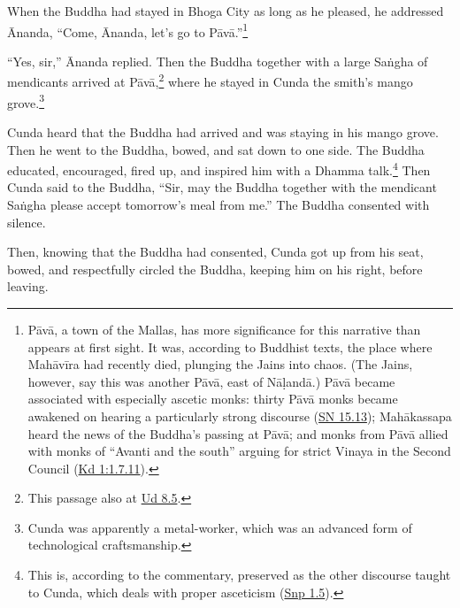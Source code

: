 \documentclass[12pt,openany]{book}%
\begin{document}
When the Buddha had stayed in Bhoga City as long as he pleased, he addressed Ānanda, “Come, Ānanda, let’s go to \textsanskrit{Pāvā}.”\footnote{\textsanskrit{Pāvā}, a town of the Mallas, has more significance for this narrative than appears at first sight. It was, according to Buddhist texts, the place where \textsanskrit{Mahāvīra} had recently died, plunging the Jains into chaos. (The Jains, however, say this was another \textsanskrit{Pāvā}, east of \textsanskrit{Nāḷandā}.) \textsanskrit{Pāvā} became associated with especially ascetic monks: thirty \textsanskrit{Pāvā} monks became awakened on hearing a particularly strong discourse (\href{https://suttacentral.net/sn15.13/en/sujato}{SN 15.13}); \textsanskrit{Mahākassapa} heard the news of the Buddha’s passing at \textsanskrit{Pāvā}; and monks from \textsanskrit{Pāvā} allied with monks of “Avanti and the south” arguing for strict Vinaya in the Second Council (\href{https://suttacentral.net/pli-tv-kd1/en/sujato\#1.7.11}{Kd 1:1.7.11}). } 

“Yes, sir,” Ānanda replied. Then the Buddha together with a large \textsanskrit{Saṅgha} of mendicants arrived at \textsanskrit{Pāvā},\footnote{This passage also at \href{https://suttacentral.net/ud8.5/en/sujato}{Ud 8.5}. } where he stayed in Cunda the smith’s mango grove.\footnote{Cunda was apparently a metal-worker, which was an advanced form of technological craftsmanship. } 

Cunda heard that the Buddha had arrived and was staying in his mango grove. Then he went to the Buddha, bowed, and sat down to one side. The Buddha educated, encouraged, fired up, and inspired him with a Dhamma talk.\footnote{This is, according to the commentary, preserved as the other discourse taught to Cunda, which deals with proper asceticism (\href{https://suttacentral.net/snp1.5/en/sujato}{Snp 1.5}). } Then Cunda said to the Buddha, “Sir, may the Buddha together with the mendicant \textsanskrit{Saṅgha} please accept tomorrow’s meal from me.” The Buddha consented with silence. 

Then, knowing that the Buddha had consented, Cunda got up from his seat, bowed, and respectfully circled the Buddha, keeping him on his right, before leaving. 
\end{document}
